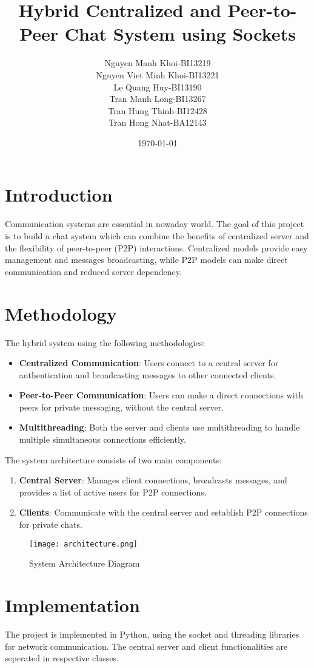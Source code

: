 \documentclass[12pt]{article}
\title{Hybrid Centralized and Peer-to-Peer Chat System using Sockets}
\author{
    Nguyen Manh Khoi-BI13219 \\
    Nguyen Viet Minh Khoi-BI13221 \\
    Le Quang Huy-BI13190 \\
    Tran Manh Long-BI13267 \\
    Tran Hung Thinh-BI12428 \\
    Tran Hong Nhat-BA12143
}
\date{\today}
\begin{document}
\maketitle

\section{Introduction}
Communication systems are essential in nowaday world. The goal of this project is to build a chat system which can combine the benefits of centralized server and the flexibility of peer-to-peer (P2P) interactions. Centralized models provide easy management and messages broadcasting, while P2P models can make direct communication and reduced server dependency.

\section{Methodology}
The hybrid system using the following methodologies:
\begin{itemize}
    \item \textbf{Centralized Communication}: Users connect to a central server for authentication and broadcasting messages to other connected clients.
    \item \textbf{Peer-to-Peer Communication}: Users can make a direct connections with peers for private messaging, without the central server.
    \item \textbf{Multithreading}: Both the server and clients use multithreading to handle multiple simultaneous connections efficiently.
\end{itemize}

The system architecture consists of two main components:
\begin{enumerate}
    \item \textbf{Central Server}: Manages client connections, broadcasts messages, and provides a list of active users for P2P connections.
    \item \textbf{Clients}: Communicate with the central server and establish P2P connections for private chats.
\end{enumerate}

\begin{figure}[h!]
    \centering
    \texttt{[image: architecture.png]}
    \caption{System Architecture Diagram}
    \label{fig:architecture}
\end{figure}

\section{Implementation}
The project is implemented in Python, using the socket and threading libraries for network communication. The central server and client functionalities are seperated in respective classes.
\end{document}
